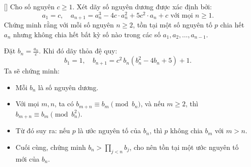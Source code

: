 \documentclass[../06-largest-exponent.tex]{subfiles}
\begin{document}
\begin{example*}\label{example:TWN-2015-TST3-D1-P3}[\textbf{}]
    Cho số nguyên \( c \geq 1 \). Xét dãy số nguyên dương được xác định bởi:
    \[
        a_1 = c,\quad a_{n+1} = a_n^3 - 4c \cdot a_n^2 + 5c^2 \cdot a_n + c \text{ với mọi } n \ge 1.
    \]
    Chứng minh rằng với mỗi số nguyên \( n \ge 2 \), tồn tại một số nguyên tố \( p \) chia hết \( a_n \)
    nhưng không chia hết bất kỳ số nào trong các số \( a_1, a_2, \dotsc, a_{n-1} \).
\end{example*}

\begin{story*}
    Đặt \( b_n = \frac{a_n}{c} \). Khi đó dãy thỏa đệ quy: 
    \[
        b_1 = 1,\quad b_{n+1} = c^2\,b_n(b_n^2 - 4b_n + 5) + 1.
    \]
    Ta sẽ chứng minh:
    \begin{itemize}[topsep=0pt, partopsep=0pt, itemsep=0pt]
        \item Mỗi \( b_n \) là số nguyên dương.
        \item Với mọi \( m, n \), ta có \( b_{m+n} \equiv b_m \pmod{b_n} \), và nếu \( m \ge 2 \), thì \( b_{m+n} \equiv b_m \pmod{b_n^2} \).
        \item Từ đó suy ra: nếu \( p \) là ước nguyên tố của \( b_n \), thì \( p \) không chia \( b_m \) với \( m > n \).
        \item Cuối cùng, chứng minh \( b_n > \prod_{j < n} b_j \), cho nên tồn tại một ước nguyên tố mới của \( b_n \).
    \end{itemize}
\end{story*}
\end{document}
